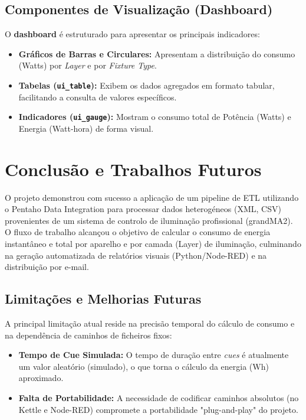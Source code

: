 \documentclass[a4paper, 12pt]{article}
\begin{document}
	\subsection{Componentes de Visualização (Dashboard)}
	O \textbf{dashboard} é estruturado para apresentar os principais indicadores:
	\begin{itemize}
		\item \textbf{Gráficos de Barras e Circulares:} Apresentam a distribuição do consumo (Watts) por \textit{Layer} e por \textit{Fixture Type}.
		\item \textbf{Tabelas (\texttt{ui\_table}):} Exibem os dados agregados em formato tabular, facilitando a consulta de valores específicos.
		\item \textbf{Indicadores (\texttt{ui\_gauge}):} Mostram o consumo total de Potência (Watts) e Energia (Watt-hora) de forma visual.
	\end{itemize}
	
	\section{Conclusão e Trabalhos Futuros}
	
	O projeto demonstrou com sucesso a aplicação de um pipeline de ETL utilizando o Pentaho Data Integration para processar dados heterogéneos (XML, CSV) provenientes de um sistema de controlo de iluminação profissional (grandMA2). O fluxo de trabalho alcançou o objetivo de calcular o consumo de energia instantâneo e total por aparelho e por camada (Layer) de iluminação, culminando na geração automatizada de relatórios visuais (Python/Node-RED) e na distribuição por e-mail.
	
	\subsection{Limitações e Melhorias Futuras}
	
	A principal limitação atual reside na precisão temporal do cálculo de consumo e na dependência de caminhos de ficheiros fixos:
	\begin{itemize}
		\item \textbf{Tempo de Cue Simulada:} O tempo de duração entre \textit{cues} é atualmente um valor aleatório (simulado), o que torna o cálculo da energia ($\text{Wh}$) aproximado.
		\item \textbf{Falta de Portabilidade:} A necessidade de codificar caminhos absolutos (no Kettle e Node-RED) compromete a portabilidade "plug-and-play" do projeto.
	\end{itemize}
	
\end{document}
